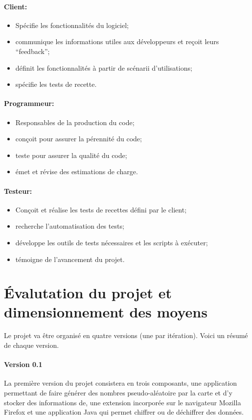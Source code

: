 \documentclass[a4paper,11pt,french]{article}
\begin{document}
\paragraph{Client:}
\begin{itemize}
 \item Spécifie les fonctionnalités du logiciel;
 \item communique les informations utiles aux développeurs et reçoit leurs 
``feedback'';
 \item définit les fonctionnalités à partir de scénarii d'utilisations;
 \item spécifie les tests de recette.
\end{itemize}

\paragraph{Programmeur:}
\begin{itemize}
 \item Responsables de la production du code;
 \item conçoit pour assurer la pérennité du code;
 \item teste pour assurer la qualité du code;
 \item émet et révise des estimations de charge.
\end{itemize}

\paragraph{Testeur:}
\begin{itemize}
 \item Conçoit et réalise les tests de recettes défini par le client;
 \item recherche l'automatisation des tests;
 \item développe les outils de tests nécessaires et les scripts à exécuter;
 \item témoigne de l'avancement du projet.
\end{itemize}

\section{Évalutation du projet et dimensionnement des moyens}
Le projet va être organisé en quatre versions (une par itération).
Voici un résumé de chaque version.

\paragraph{Version 0.1} 
La première version du projet consistera en trois composants, une application
permettant de faire générer des nombres pseudo-aléatoire par la
carte et d'y stocker des informations de, une extension incorporée sur 
le navigateur Mozilla Firefox et une application Java qui permet chiffrer 
ou de déchiffrer des données.
\end{document}
